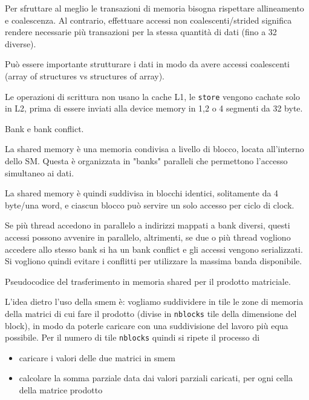 \begin{questions}
\begin{solution}
        Per sfruttare al meglio le transazioni di memoria bisogna rispettare allineamento e coalescenza. Al contrario, effettuare accessi non coalescenti/strided significa rendere necessarie più transazioni per la stessa quantità di dati (fino a 32 diverse).
        
        Può essere importante strutturare i dati in modo da avere accessi coalescenti (array of structures vs structures of array).
        
        Le operazioni di scrittura non usano la cache L1, le \texttt{store} vengono cachate solo in L2, prima di essere inviati alla device memory in 1,2 o 4 segmenti da 32 byte.
    \end{solution}
    
    \question Bank e bank conflict.
    
    \begin{solution}
        La shared memory è una memoria condivisa a livello di blocco, locata all'interno dello SM. Questa è organizzata in "banks" paralleli che permettono l'accesso simultaneo ai dati.
        
        La shared memory è quindi suddivisa in blocchi identici, solitamente da 4 byte/una word, e ciascun blocco può servire un solo accesso per ciclo di clock. 
        
        Se più thread accedono in parallelo a indirizzi mappati a bank diversi, questi accessi possono avvenire in parallelo, altrimenti, se due o più thread vogliono accedere allo stesso bank si ha un bank conflict e gli accessi vengono serializzati. Si vogliono quindi evitare i conflitti per utilizzare la massima banda disponibile.
    \end{solution}
    
    \question Pseudocodice del trasferimento in memoria shared per il prodotto matriciale.
    
    \begin{solution}
    	L'idea dietro l'uso della smem è: vogliamo suddividere in tile le zone di memoria della matrici di cui fare il prodotto (divise in \texttt{nblocks} tile della dimensione del block), in modo da poterle caricare con una suddivisione del lavoro più equa possibile. Per il numero di tile \texttt{nblocks} quindi si ripete il processo di 
    	\begin{itemize}
    		\item caricare i valori delle due matrici in smem
    		
    		\item calcolare la somma parziale data dai valori parziali caricati, per ogni cella della matrice prodotto
    	\end{itemize}
    	

\end{solution}
\end{questions}
